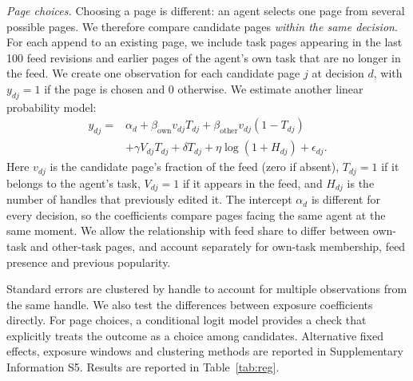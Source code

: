 \documentclass[11pt]{article}
\begin{document}
\textit{Page choices.}
Choosing a page is different: an agent selects one page from several possible pages. We therefore compare candidate pages \emph{within the same decision}. For each append to an existing page, we include task pages appearing in the last 100 feed revisions and earlier pages of the agent's own task that are no longer in the feed. We create one observation for each candidate page $j$ at decision $d$, with $y_{dj}=1$ if the page is chosen and $0$ otherwise. We estimate another linear probability model:
\begin{equation}
\begin{aligned}
y_{dj}={}&\alpha_d
+\beta_{\mathrm{own}}v_{dj}T_{dj}
+\beta_{\mathrm{other}}v_{dj}(1-T_{dj})\\
&+\gamma V_{dj}T_{dj}
+\delta T_{dj}
+\eta\log(1+H_{dj})+\epsilon_{dj}.
\end{aligned}
\label{eq:page_reg}
\end{equation}
Here $v_{dj}$ is the candidate page's fraction of the feed (zero if absent), $T_{dj}=1$ if it belongs to the agent's task, $V_{dj}=1$ if it appears in the feed, and $H_{dj}$ is the number of handles that previously edited it. The intercept $\alpha_d$ is different for every decision, so the coefficients compare pages facing the same agent at the same moment. We allow the relationship with feed share to differ between own-task and other-task pages, and account separately for own-task membership, feed presence and previous popularity. 

Standard errors are clustered by handle to account for multiple observations from the same handle. We also test the differences between exposure coefficients directly. For page choices, a conditional logit model provides a check that explicitly treats the outcome as a choice among candidates. Alternative fixed effects, exposure windows and clustering methods are reported in Supplementary Information S5. Results are reported in Table~\ref{tab:reg}.

\begin{table}[t]
\centering\small
\caption{\textbf{Prior exposure and individual choices.} Linear probability models estimated by OLS. The outcome is 1 when a candidate page is chosen, a username contains the feature, or a first convention use takes form A. Entries are coefficients, with standard errors clustered by handle in parentheses. Names and conventions include task-family by three-hour fixed effects; page choice includes one fixed effect per arrival, which already absorbs task and time. The page model's $R^2$ is measured within arrivals.}
\label{tab:reg}

\end{table}
\end{document}

